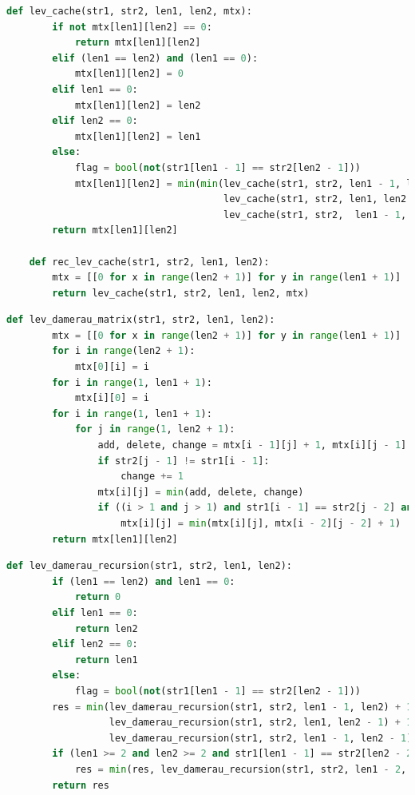 \documentclass[12pt]{report}
\begin{document}
	\begin{lstlisting}[label=some-code,caption=Функция нахождения расстояние Левенштейна рекурсивно с помощью кэша,language=Python]
	def lev_cache(str1, str2, len1, len2, mtx):
		if not mtx[len1][len2] == 0:
			return mtx[len1][len2]
		elif (len1 == len2) and (len1 == 0):
			mtx[len1][len2] = 0
		elif len1 == 0:
			mtx[len1][len2] = len2
		elif len2 == 0:
			mtx[len1][len2] = len1
		else:
			flag = bool(not(str1[len1 - 1] == str2[len2 - 1]))
			mtx[len1][len2] = min(min(lev_cache(str1, str2, len1 - 1, len2, mtx) + 1,
									  lev_cache(str1, str2, len1, len2 - 1, mtx) + 1),
									  lev_cache(str1, str2,  len1 - 1, len2 - 1, mtx) + flag)
		return mtx[len1][len2]
		
	def rec_lev_cache(str1, str2, len1, len2):
		mtx = [[0 for x in range(len2 + 1)] for y in range(len1 + 1)]
		return lev_cache(str1, str2, len1, len2, mtx)
	\end{lstlisting}
	
	\begin{lstlisting}[label=some-code,caption=Функция нахождения расстояния Дамерау-Левенштейна матрично,language=Python]
	def lev_damerau_matrix(str1, str2, len1, len2):
		mtx = [[0 for x in range(len2 + 1)] for y in range(len1 + 1)]
		for i in range(len2 + 1):
			mtx[0][i] = i
		for i in range(1, len1 + 1):
			mtx[i][0] = i
		for i in range(1, len1 + 1):
			for j in range(1, len2 + 1):
				add, delete, change = mtx[i - 1][j] + 1, mtx[i][j - 1] + 1, mtx[i - 1][j - 1]
				if str2[j - 1] != str1[i - 1]:
					change += 1
				mtx[i][j] = min(add, delete, change)
				if ((i > 1 and j > 1) and str1[i - 1] == str2[j - 2] and str1[i - 2] == str2[j - 1]):
					mtx[i][j] = min(mtx[i][j], mtx[i - 2][j - 2] + 1)
		return mtx[len1][len2]
	\end{lstlisting}
	
	\begin{lstlisting}[label=some-code,caption=Функция нахождения расстояния Дамерау-Левенштейна рекурсивно,language=Python]
	def lev_damerau_recursion(str1, str2, len1, len2):
		if (len1 == len2) and len1 == 0:
			return 0
		elif len1 == 0:
			return len2
		elif len2 == 0:
			return len1
		else:
			flag = bool(not(str1[len1 - 1] == str2[len2 - 1]))
		res = min(lev_damerau_recursion(str1, str2, len1 - 1, len2) + 1,
				  lev_damerau_recursion(str1, str2, len1, len2 - 1) + 1,
				  lev_damerau_recursion(str1, str2, len1 - 1, len2 - 1) + flag)
		if (len1 >= 2 and len2 >= 2 and str1[len1 - 1] == str2[len2 - 2] and str1[len1 - 2] == str2[len2 - 1]):
			res = min(res, lev_damerau_recursion(str1, str2, len1 - 2, len2 - 2) + 1)
		return res 
	\end{lstlisting}
	
\end{document}

